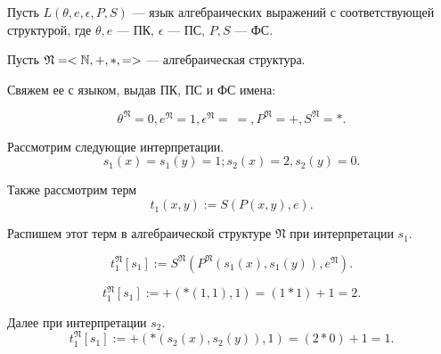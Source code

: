     \begin{Example}
        Пусть $L(\theta, e, \epsilon, P, S)$ --- язык алгебраических выражений с соответствующей структурой, где $\theta, e$ --- ПК, $\epsilon$ --- ПС, $P, S$ --- ФС. 

        Пусть $\mathfrak{N} = <\mathbb{N}, +, *, =>$ --- алгебраическая структура. 

        Свяжем ее с языком, выдав ПК, ПС и ФС имена: 

        $$\theta^{\mathfrak{N}} = 0, e^{\mathfrak{N}} = 1, \epsilon^{\mathfrak{N}} = \ =, P^{\mathfrak{N}} = +, S^{\mathfrak{N}} = *.$$

        Рассмотрим следующие интерпретации.
        $$s_1(x) = s_1(y) = 1; s_2(x) = 2, s_2(y) = 0.$$

        Также рассмотрим терм $$t_1(x,y) := S(P(x,y), e).$$

        Распишем этот терм в алгебраической структуре $\mathfrak{N}$ при интерпретации $s_1$.

        $$t_1^{\mathfrak{N}}[s_1] := S^{\mathfrak{N}}(P^{\mathfrak{N}}(s_1(x), s_1(y)), e^{\mathfrak{N}}).$$
        
        $$t_1^{\mathfrak{N}}[s_1] := +(*(1,1), 1) = (1 * 1) + 1 = 2.$$

        Далее при интерпретации $s_2$.
        $$t_1^{\mathfrak{N}}[s_1] := +(*(s_2(x),s_2(y)), 1) = (2 * 0) + 1 = 1.$$
    \end{Example}

